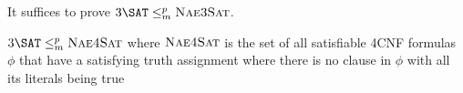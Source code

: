 
It suffices to prove $3\SAT \leq_m^p \naetsat$.
\begin{claim}
    $3\SAT \polyreduce \naefsat$ where $\textsc{Nae4Sat}$ is the set of all satisfiable 4CNF formulas $\phi$ that have a satisfying truth assignment where there is no clause in $\phi$ with all its literals being true
\end{claim}
